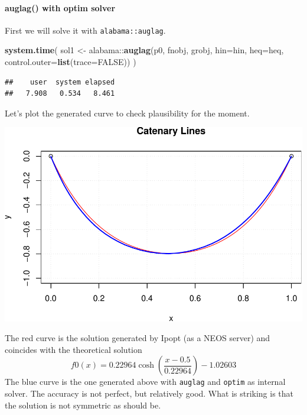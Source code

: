 \documentclass[]{article}
\newenvironment{Shaded}{\begin{snugshade}}{\end{snugshade}}
\newcommand{\KeywordTok}[1]{\textcolor[rgb]{0.13,0.29,0.53}{\textbf{{#1}}}}
\newcommand{\DataTypeTok}[1]{\textcolor[rgb]{0.13,0.29,0.53}{{#1}}}
\newcommand{\StringTok}[1]{\textcolor[rgb]{0.31,0.60,0.02}{{#1}}}
\newcommand{\OtherTok}[1]{\textcolor[rgb]{0.56,0.35,0.01}{{#1}}}
\newcommand{\NormalTok}[1]{{#1}}
\let\oldparagraph\paragraph
\renewcommand{\paragraph}[1]{\oldparagraph{#1}\mbox{}}
\begin{document}
\paragraph{auglag() with optim solver}\label{auglag-with-optim-solver}

First we will solve it with \texttt{alabama::auglag}.

\begin{Shaded}
\begin{Highlighting}[]
\KeywordTok{system.time}\NormalTok{(}
\NormalTok{sol1 <-}\StringTok{ }\NormalTok{alabama::}\KeywordTok{auglag}\NormalTok{(p0, fnobj, grobj, }\DataTypeTok{hin=}\NormalTok{hin, }\DataTypeTok{heq=}\NormalTok{heq,}
                       \DataTypeTok{control.outer=}\KeywordTok{list}\NormalTok{(}\DataTypeTok{trace=}\OtherTok{FALSE}\NormalTok{))}
\NormalTok{)}
\end{Highlighting}
\end{Shaded}

\begin{verbatim}
##    user  system elapsed 
##   7.908   0.534   8.461
\end{verbatim}

Let's plot the generated curve to check plausibility for the moment.

\includegraphics{catenary_files/figure-latex/unnamed-chunk-7-1.pdf}

The red curve is the solution generated by Ipopt (as a NEOS server) and
coincides with the theoretical solution \[
  f0(x) = 0.22964 \cosh(\frac{x - 0.5}{0.22964}) - 1.02603
\] The blue curve is the one generated above with \texttt{auglag} and
\texttt{optim} as internal solver. The accuracy is not perfect, but
relatively good. What is striking is that the solution is not symmetric
as should be.
\end{document}
